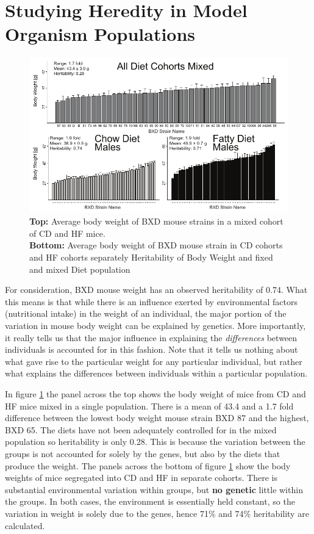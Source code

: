 \documentclass[a4paper]{book}
\begin{document}
	\section{Studying Heredity in Model Organism Populations}
	\begin{figure}[!htbp]
		\includegraphics[width=\textwidth]{1.Introduction_Figures/BodyWeights.pdf}
		\caption{ \textbf{Top:} Average body weight of BXD mouse strains in a mixed cohort of CD and HF mice.\\ \textbf{Bottom:} Average body weight of BXD mouse strain in CD cohorts and HF cohorts separately
			Heritability of Body Weight and fixed and mixed Diet population}
		\label{fig:Heritablity in Diet and Mixed Populations}
	\end{figure}
	
	For consideration, BXD mouse weight has an observed heritability of 0.74. What this means is that while there is an influence exerted by environmental factors (nutritional intake) in the weight of an individual, the major portion of the variation in mouse body weight can be explained by genetics. More importantly, it really tells us that the major influence in explaining the \textit{differences} between individuals is accounted for in this fashion. Note that it tells us nothing about what gave rise to the particular weight for any particular individual, but rather what explains the differences between individuals within a particular population.
	
	 In figure \ref{fig:Heritablity in Diet and Mixed Populations} the panel across the top shows the body weight of mice from CD and HF mice mixed in a single population. There is a mean of 43.4 and a 1.7 fold difference between the lowest body weight mouse strain BXD 87 and the highest, BXD 65. The diets have not been adequately controlled for in the mixed population so heritability is only 0.28.  This is because the variation between the groups is not accounted for solely by the genes, but also by the diets that produce the weight.  The panels across the bottom of figure \ref{fig:Heritablity in Diet and Mixed Populations} show the body weights of mice segregated into CD and HF in separate cohorts. There is substantial environmental variation within  groups, but \textbf{no genetic} little within the groups. In both cases, the environment is essentially held constant, so the variation in weight is solely due to the genes, hence 71\% and 74\% heritability are calculated.
	
\end{document}
